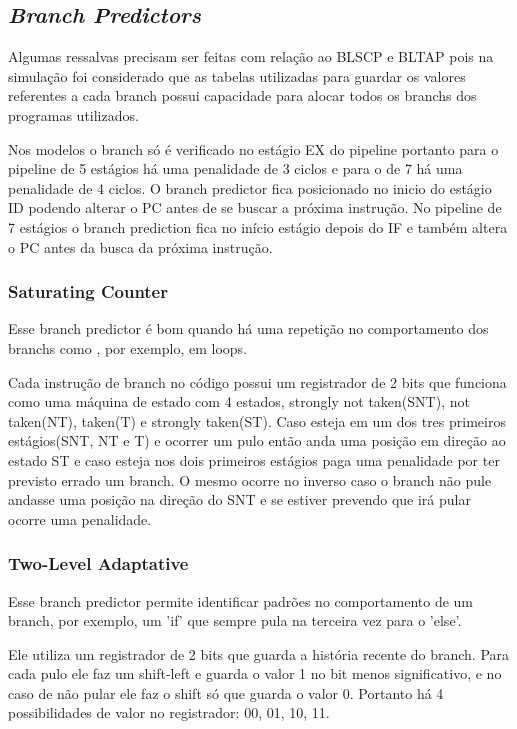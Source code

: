 \documentclass[pdftex,12pt,a4paper]{article}
\begin{document}
\subsection{\textit{Branch Predictors}}

Algumas ressalvas precisam ser feitas com relação ao BLSCP e BLTAP pois na simulação foi considerado 
que as tabelas utilizadas para guardar os valores referentes a cada branch possui capacidade para 
alocar todos os branchs dos programas utilizados. 

Nos modelos o branch só é verificado no estágio EX do pipeline portanto para o pipeline de 5 estágios 
há uma penalidade de 3 ciclos e para o de 7 há uma penalidade de 4 ciclos. O branch predictor 
fica posicionado no inicio do estágio ID podendo alterar o PC antes de se buscar a próxima instrução.
No pipeline de 7 estágios o branch prediction fica no início estágio depois do IF e também altera o 
PC antes da busca da próxima instrução. 

\subsubsection{Saturating Counter}

Esse branch predictor é bom quando há uma repetição no comportamento dos branchs como , 
por exemplo, em loops.

Cada instrução de branch no código possui um registrador de 2 bits que funciona como uma máquina de estado 
com 4 estados, strongly not taken(SNT), not taken(NT), taken(T) e strongly taken(ST). Caso esteja em um dos 
tres primeiros estágios(SNT, NT e T) e ocorrer um pulo então anda uma posição em direção ao estado ST e 
caso esteja nos dois primeiros estágios paga uma penalidade por ter previsto errado um branch. O mesmo 
ocorre no inverso caso o branch não pule andasse uma posição na direção do SNT e se estiver prevendo 
que irá pular ocorre uma penalidade.

\subsubsection{Two-Level Adaptative}

Esse branch predictor permite identificar padrões no comportamento de um branch, por exemplo, um 'if' 
que sempre pula na terceira vez para o 'else'.

Ele utiliza um registrador de 2 bits que guarda a história recente do branch. Para cada pulo 
ele faz um shift-left e guarda o valor 1 no bit menos significativo, e no caso de não 
pular ele faz o shift só que guarda o valor 0. Portanto há 4 possibilidades de valor no 
registrador: 00, 01, 10, 11.
\end{document}
